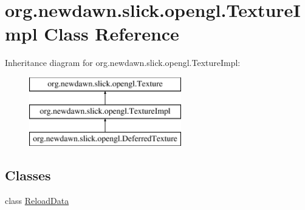 \hypertarget{classorg_1_1newdawn_1_1slick_1_1opengl_1_1_texture_impl}{}\section{org.\+newdawn.\+slick.\+opengl.\+Texture\+Impl Class Reference}
\label{classorg_1_1newdawn_1_1slick_1_1opengl_1_1_texture_impl}
Inheritance diagram for org.\+newdawn.\+slick.\+opengl.\+Texture\+Impl\+:\begin{figure}[H]
\begin{center}
\leavevmode
\includegraphics[height=3.000000cm]{classorg_1_1newdawn_1_1slick_1_1opengl_1_1_texture_impl}
\end{center}
\end{figure}
\subsection*{Classes}
\begin{DoxyCompactItemize}
\item 
class \mbox{\hyperlink{classorg_1_1newdawn_1_1slick_1_1opengl_1_1_texture_impl_1_1_reload_data}{Reload\+Data}}
\end{DoxyCompactItemize}
